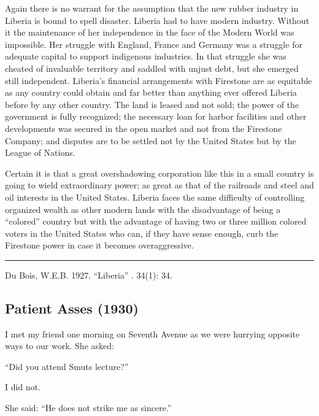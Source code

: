\documentclass[letterpaper,10pt,english]{jupyterBook}
\begin{document}
\sphinxAtStartPar
Again there is no warrant for the assumption that the new rubber industry in Liberia is bound to spell disaster. Liberia had to have modern industry. Without it the maintenance of her independence in the face of the Modern World was impossible. Her struggle with England, France and Germany was a struggle for adequate capital to support indigenous industries. In that struggle she was cheated of invaluable territory and saddled with unjust debt, but she emerged still independent. Liberia’s financial arrangements with Firestone are as equitable as any country could obtain and far better than anything ever offered Liberia before by any other country. The land is leased and not sold; the power of the government is fully recognized; the necessary loan for harbor facilities and other developments was secured in the open market and not from the Firestone Company; and disputes are to be settled not by the United States but by the League of Nations.

\sphinxAtStartPar
Certain it is that a great overshadowing corporation like this in a small country is going to wield extraordinary power; as great as that of the railroads and steel and oil interests in the United States. Liberia faces the same difficulty of controlling organized wealth as other modern lands with the disadvantage of being a “colored” country\sphinxhyphen{} but with the advantage of having two or three million colored voters in the United States who can, if they have sense enough, curb the Firestone power in case it becomes over\sphinxhyphen{}aggressive.


\bigskip\hrule\bigskip


\sphinxAtStartPar
{} Du Bois, W.E.B. 1927. “Liberia” . 34(1): 34.


\subsection{Patient Asses (1930)}
\label{\detokenize{Volumes/37/03/patient_asses:patient-asses-1930}}\label{\detokenize{Volumes/37/03/patient_asses::doc}}
\sphinxAtStartPar
I met my friend one morning on Seventh Avenue as we were hurrying opposite ways to our work. She asked:

\sphinxAtStartPar
“Did you attend Smuts lecture?”

\sphinxAtStartPar
I did not.

\sphinxAtStartPar
She said: “He does not strike me as sincere.”
\end{document}
